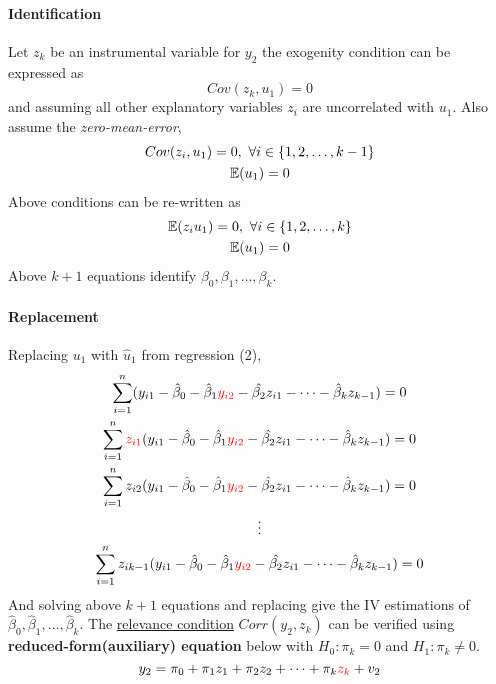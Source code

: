 \documentclass[]{article}
\begin{document}
			\paragraph{Identification} Let $z_k$ be an instrumental variable for $y_2$ the exogenity condition can be expressed as
			\[
				Cov(z_k, u_1) = 0
			\]
			and assuming all other explanatory variables $z_i$ are uncorrelated with $u_1$. Also assume the \emph{zero-mean-error},
			\begin{gather*}
				Cov(z_i, u_1) = 0,\ \forall i \in \{1, 2, \dots, k - 1\} \\
				\mathbb{E}({u_1}) = 0
			\end{gather*}
			Above conditions can be re-written as 
			\begin{gather*}
				\mathbb{E}({z_i u_1}) = 0,\ \forall i \in \{1,2, \dots, k\} \\
				\mathbb{E}({u_1}) = 0
			\end{gather*}
			Above $k+1$ equations identify $\beta_0, \beta_1, \dots, \beta_k$.
			
			\paragraph{Replacement} Replacing $u_1$ with $\hat{u}_1$ from regression (2),
			\begin{gather*}
				\sum_{i=1}^n(y_{i1} - \hat{\beta}_0 - \hat{\beta}_1 \textcolor{red}{y_{i2}} - \hat{\beta_2}z_{i1} - \cdots - \hat{\beta}_k z_{k-1}) = 0 \\
				\sum_{i=1}^n \textcolor{red}{z_{i1}} (y_{i1} - \hat{\beta}_0 - \hat{\beta}_1 \textcolor{red}{y_{i2}} - \hat{\beta_2}z_{i1} - \cdots - \hat{\beta}_k z_{k-1}) = 0 \\
				\sum_{i=1}^n z_{i2} (y_{i1} - \hat{\beta}_0 - \hat{\beta}_1 \textcolor{red}{y_{i2}} - \hat{\beta_2}z_{i1} - \cdots - \hat{\beta}_k z_{k-1}) = 0 \\
				\vdots \\
				\sum_{i=1}^n z_{ik-1}(y_{i1} - \hat{\beta}_0 - \hat{\beta}_1 \textcolor{red}{y_{i2}} - \hat{\beta_2}z_{i1} - \cdots - \hat{\beta}_k z_{k-1}) = 0
			\end{gather*}
			And solving above $k+1$ equations and replacing  give the IV estimations of $\hat{\beta}_0, \hat{\beta}_1, \dots, \hat{\beta}_{k}$.
			\newline
			The \ul{relevance condition} $Corr(y_2, z_k)$ can be verified using \textbf{reduced-form(auxiliary) equation} below with $H_0: \pi_k = 0$ and $H_1: \pi_k \neq 0$.
			\[
				y_2 = \pi_0 + \pi_1 z_1 + \pi_2 z_2 + \cdots + \pi_k \textcolor{red}{z_k} + v_2
			\]
	
\end{document}
